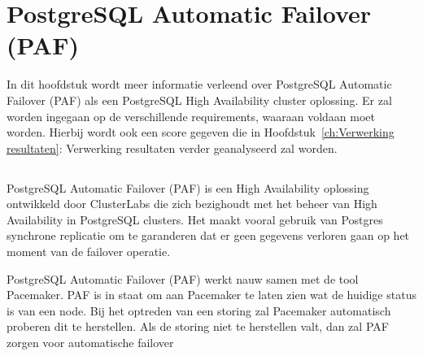 
\chapter{PostgreSQL Automatic Failover (PAF)}
\label{ch:PostgreSQL Automatic Failover (PAF)}

In dit hoofdstuk wordt meer informatie verleend over PostgreSQL Automatic Failover (PAF) als een PostgreSQL High Availability cluster oplossing. Er zal worden ingegaan op de verschillende requirements, waaraan voldaan moet worden. Hierbij wordt ook een score gegeven die in Hoofdstuk~\ref{ch:Verwerking resultaten}: Verwerking resultaten verder geanalyseerd zal worden.



\section{}
\label{sec:Inleiding tot PostgreSQL Automatic Failover (PAF)}

PostgreSQL Automatic Failover (PAF) is een High Availability oplossing ontwikkeld door ClusterLabs die zich bezighoudt met het beheer van High Availability in PostgreSQL clusters. Het maakt vooral gebruik van Postgres synchrone replicatie om te garanderen dat er geen gegevens verloren gaan op het moment van de failover operatie. 

PostgreSQL Automatic Failover (PAF) werkt nauw samen met de tool Pacemaker. PAF is in staat om aan Pacemaker te laten zien wat de huidige status is van een node. Bij het optreden van een storing zal Pacemaker automatisch proberen dit te herstellen.
Als de storing niet te herstellen valt, dan zal PAF zorgen voor automatische failover

